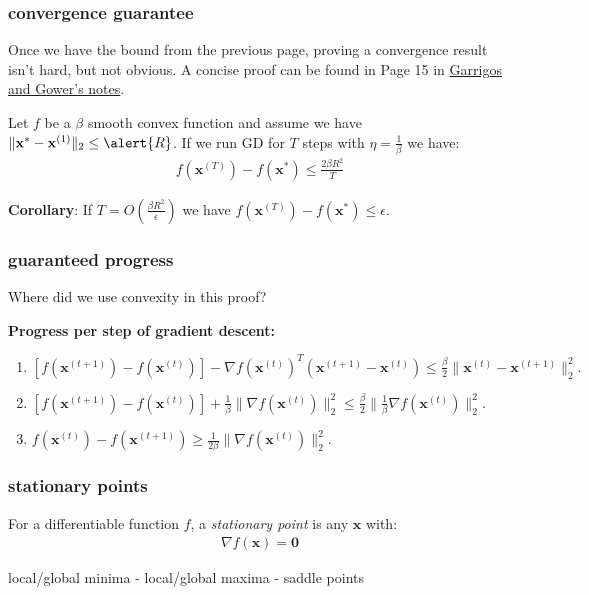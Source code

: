 \documentclass[compress]{beamer}
\newcommand{\bv}[1]{\mathbf{#1}}
\begin{document}
\begin{frame}[t]
	\frametitle{convergence guarantee}
	Once we have the bound from the previous page, proving a convergence result isn't hard, but not obvious. A concise proof can be found in Page 15 in \textcolor{blue}{\href{https://gowerrobert.github.io/pdf/M2_statistique_optimisation/grad_conv.pdf}{Garrigos and Gower's notes}.}
	\vspace{.5em}

	\begin{theorem}
		Let $f$ be a \alert{$\beta$} smooth convex function and assume we have $\|\bv{x}^{*} - \bv{x}^{(1)}\|_2 \leq \alert{R}$. If we run GD for $T$ steps with $\eta = \frac{1}{\beta}$ we have:
		\begin{align*}
			f(\bv{x}^{(T)}) - f(\bv{x}^*) \leq \frac{2\beta R^2}{T} 
		\end{align*} 
	\end{theorem}
	\textbf{Corollary}: If \alert{$T = O\left(\frac{\beta R^2}{\epsilon}\right)$} we have $f(\bv{x}^{(T)}) - f(\bv{x}^*) \leq \epsilon$.
\end{frame}

\begin{frame}[t]
	\frametitle{guaranteed progress}
	\begin{center}
		Where did we use convexity in this proof?
	\end{center}
	
	\textbf{Progress per step of gradient descent:}
	\begin{enumerate}[1.]
		\item $\left[f(\bv{x}^{(t+1)}) - f(\bv{x}^{(t)})\right] - \nabla f(\bv{x}^{(t)})^T(\bv{x}^{(t+1)} - \bv{x}^{(t)})  \leq \frac{\beta}{2}\|\bv{x}^{(t)} - \bv{x}^{(t+1)}\|_2^2.$\vspace{1.5em}
		\item $\left[f(\bv{x}^{(t+1)}) - f(\bv{x}^{(t)})\right] + 
		\frac{1}{\beta}\|\nabla f(\bv{x}^{(t)})\|_2^2 \leq \frac{\beta}{2}\|\frac{1}{\beta}\nabla f(\bv{x}^{(t)})\|_2^2.$\vspace{1.5em}
		\item $f(\bv{x}^{(t)}) - f(\bv{x}^{(t+1)}) \geq {\frac{1}{2\beta}\|\nabla f(\bv{x}^{(t)})\|_2^2}.$
	\end{enumerate}
\end{frame}

\begin{frame}[t]
	\frametitle{stationary points}
	\begin{definition}
		For a differentiable function $f$, a \emph{stationary point} is any $\bv{x}$ with: 
		\begin{align*}
			\nabla f(\bv{x}) = \bv{0}
		\end{align*}
	\end{definition}
	\begin{center}
		local/global minima - local/global maxima - saddle points
	\end{center}
\end{frame}
\end{document}
